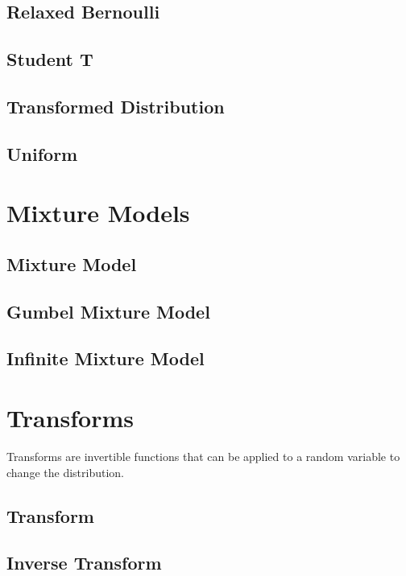 \documentclass{article}
\begin{document}
\subsection{Relaxed Bernoulli}
\subsection{Student T}
\subsection{Transformed Distribution}
\subsection{Uniform}

\section{Mixture Models}
\subsection{Mixture Model}
\subsection{Gumbel Mixture Model}
\subsection{Infinite Mixture Model}

\section{Transforms}
Transforms are invertible functions that can be applied to a
random variable to change the distribution.
\subsection{Transform}
\subsection{Inverse Transform}
\end{document}
